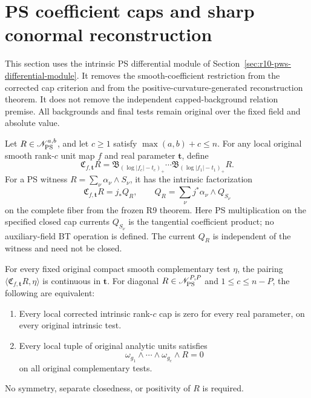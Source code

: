 \section{PS coefficient caps and sharp conormal reconstruction}
\label{sec:r10-pws-curvature-reconstruction}

This section uses the intrinsic PS differential module of
Section~\ref{sec:r10-pws-differential-module}.  It removes the
smooth-coefficient restriction from the corrected cap criterion
and from the positive-curvature-generated reconstruction theorem.
It does not remove the independent capped-background relation
premise.  All backgrounds and final tests remain original over
the fixed field and absolute value.

\begin{lemma}
\label{lem:r10-pws-corrected-cap-criterion}
Let $R\in\mathscr N_{\rm PS}^{a,b}$, and let $c\ge1$ satisfy
$\max(a,b)+c\le n$.  For any local original smooth rank-$c$
unit map $f$ and real parameter $\mathbf t$, define
\[
 \mathfrak C_{f,\mathbf t}R=
 \mathfrak B_{(\log|f_c|-t_c)_+}\cdots
 \mathfrak B_{(\log|f_1|-t_1)_+}R.
 \tag{PC1}
\]
For a PS witness $R=\sum_\nu\alpha_\nu\wedge S_\nu$, it has
the intrinsic factorization
\[
 \mathfrak C_{f,\mathbf t}R=j_*Q_R,\qquad
 Q_R=\sum_\nu j^*\alpha_\nu\wedge Q_{S_\nu}
 \tag{PC2}
\]
on the complete fiber from the frozen R9 theorem.
Here PS multiplication on the specified closed cap currents
$Q_{S_\nu}$ is the tangential coefficient product; no
auxiliary-field BT operation is defined.  The current $Q_R$
is independent of the witness and need not be closed.

For every fixed original compact smooth complementary test
$\eta$, the pairing
$\langle\mathfrak C_{f,\mathbf t}R,\eta\rangle$ is continuous
in $\mathbf t$.  For diagonal $R\in\mathscr N_{\rm PS}^{P,P}$
and $1\le c\le n-P$, the following are equivalent:
\begin{enumerate}
\item Every local corrected intrinsic rank-$c$ cap is zero
      for every real parameter, on every original intrinsic test.
\item Every local tuple of original analytic units satisfies
\[
                \omega_{g_1}\wedge\cdots\wedge\omega_{g_c}
                                  \wedge R=0
 \tag{PC3}
\]
      on all original complementary tests.
\end{enumerate}
No symmetry, separate closedness, or positivity of $R$ is
required.
\end{lemma}


